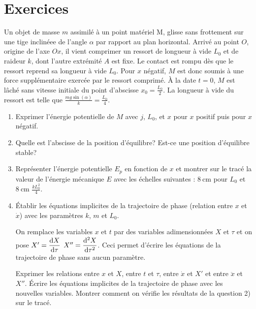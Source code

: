\section{Exercices}%
\label{chap5-sec:exercices}%
\begin{exercice}%
  Un objet de masse \(m\) assimilé à un point matériel M, glisse sans
  frottement sur une tige inclinéee de l'angle \(\alpha\) par rapport au plan
  horizontal.
  Arrivé au point \(O\), origine de l'axe \(Ox\), il vient comprimer un ressort
  de longueur à vide \(L_0\) et de raideur \(k\), dont l'autre extrémité \(A\)
  est fixe. Le contact est rompu dès que le ressort reprend sa longueur à vide
  \(L_0\). Pour \(x\) négatif, \(M\) est donc soumis à une force supplémentaire
  exercée par le ressort comprimé.
  À la date \(t=0\), \(M\) est lâché sans vitesse initiale du point d'abscisse
  \(x_0=\frac{L_0}{2}\). La longueur à vide du ressort est telle que \(\frac{mg
  \sin(\alpha)}{k} = \frac{L_0}{4}\).
  \begin{enumerate}
    \item Exprimer l'énergie potentielle de \(M\) avec \(j\), \(L_0\), et \(x\)
      pour \(x\) positif puis pour \(x\) négatif.
    \item Quelle est l'abscisse de la position d'équilibre? Est-ce une
      position d'équilibre stable?
    \item Représenter l'énergie potentielle \(E_p\) en fonction de \(x\) et
      montrer sur le tracé la valeur de l'énergie mécanique \(E\) avec les
      échelles suivantes : \(\SI{8}{\centi\meter}\) pour \(L_0\) et
      \(\SI{8}{\centi\meter}\) \(\frac{k L_0^2}{4}\).
    \item Établir les équations implicites de la trajectoire de phase (relation
      entre \(x\) et \(\dot{x}\)) avec les paramètres \(k\), \(m\) et \(L_0\).

    On remplace les variables \(x\) et \(t\) par des variables adimensionnées
      \(X\) et \(\tau\) et on pose \(X' = \dfrac{\mathrm{d} X}{\mathrm{d} \tau}\) \(X'' =
      \dfrac{\mathrm{d}^2 X}{\mathrm{d} {\tau}^2}\). Ceci permet d'écrire les équations de la
      trajectoire de phase sans aucun paramètre.

    Exprimer les relations entre \(x\) et \(X\), entre \(t\) et \(\tau\), entre
      \(\dot{x}\) et \(X'\) et entre \(\ddot{x}\) et \(X''\).
    Écrire les équations implicites de la trajectoire de phase avec les
      nouvelles variables. Montrer comment on vérifie les résultats de la
      question 2) sur le tracé.
  \end{enumerate}
\end{exercice}%
